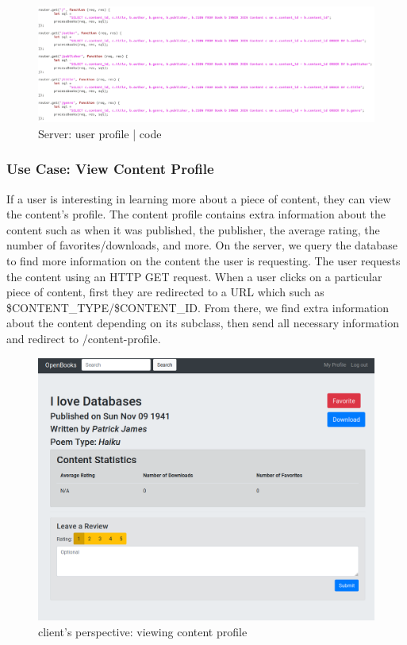 \documentclass[letter, 12pt, titlepage]{article}
\begin{document}
	\begin{figure}[h!]
		\centering
		\includegraphics[scale=0.33]{sort-code.png}
		\caption{Server: user profile | code}
	\end{figure}

\newpage


\subsubsection{Use Case: View Content Profile}
	If a user is interesting in learning more about a piece of content, they can view the content's profile. The content profile contains extra information about the content such as when it was published, the publisher, the average rating, the number of favorites/downloads, and more. On the server, we query the database to find more information on the content the user is requesting. The user requests the content using an HTTP GET request. When a user clicks on a particular piece of content, first they are redirected to a URL which such as \$CONTENT\_TYPE/\$CONTENT\_ID. From there, we find extra information about the content depending on its subclass, then send all necessary information and redirect to /content-profile.
	\begin{figure}[h!]
		\centering
		\includegraphics[scale=0.25]{content-profile.png}
		\caption{client's perspective: viewing content profile}
	\end{figure}
\end{document}
